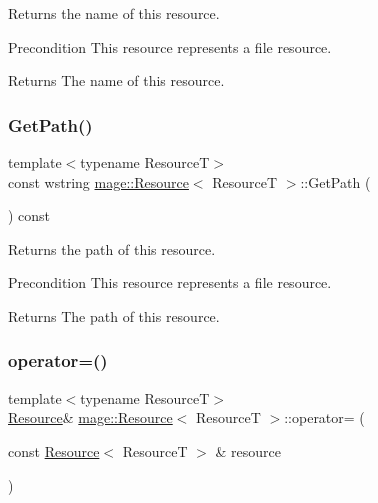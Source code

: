 Returns the name of this resource.

\begin{DoxyPrecond}{Precondition}
This resource represents a file resource. 
\end{DoxyPrecond}
\begin{DoxyReturn}{Returns}
The name of this resource. 
\end{DoxyReturn}
\hypertarget{classmage_1_1_resource_a9df55cc00e0412b1435538e8107ee563}{}\label{classmage_1_1_resource_a9df55cc00e0412b1435538e8107ee563} 
\subsubsection{\texorpdfstring{Get\+Path()}{GetPath()}}
{\footnotesize\ttfamily template$<$typename ResourceT$>$ \\
const wstring \hyperlink{classmage_1_1_resource}{mage\+::\+Resource}$<$ ResourceT $>$\+::Get\+Path (\begin{DoxyParamCaption}{ }\end{DoxyParamCaption}) const\hspace{0.3cm}{\ttfamily [noexcept]}}

Returns the path of this resource.

\begin{DoxyPrecond}{Precondition}
This resource represents a file resource. 
\end{DoxyPrecond}
\begin{DoxyReturn}{Returns}
The path of this resource. 
\end{DoxyReturn}
\hypertarget{classmage_1_1_resource_a938159cb02ec565b9b957f993db4769d}{}\label{classmage_1_1_resource_a938159cb02ec565b9b957f993db4769d} 
\subsubsection{\texorpdfstring{operator=()}{operator=()}\hspace{0.1cm}{\footnotesize\ttfamily [1/2]}}
{\footnotesize\ttfamily template$<$typename ResourceT$>$ \\
\hyperlink{classmage_1_1_resource}{Resource}\& \hyperlink{classmage_1_1_resource}{mage\+::\+Resource}$<$ ResourceT $>$\+::operator= (\begin{DoxyParamCaption}\item[{const \hyperlink{classmage_1_1_resource}{Resource}$<$ ResourceT $>$ \&}]{resource }\end{DoxyParamCaption})\hspace{0.3cm}{\ttfamily [delete]}}

